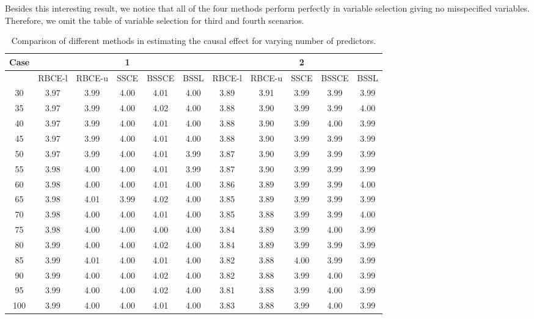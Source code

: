 \documentclass[preprint,12pt]{elsarticle}
\begin{document}
Besides this interesting result, we notice that all of the four methods perform
perfectly in variable selection giving no misspecified variables. Therefore,
we omit the table of variable selection for third and fourth scenarios.


\begin{table}[ht]
\centering
\tiny
\caption{Comparison of different methods in estimating the causal effect for varying number of predictors.}
\begin{tabular}{c|ccccc|ccccc}
  \hline
 Case&  &  & 1 &  &  &  &  & 2 &  &  \\ 
  \hline
 & RBCE-l & RBCE-u & SSCE & BSSCE & BSSL & RBCE-l & RBCE-u & SSCE & BSSCE & BSSL \\ 
  \hline
\hline
30 & 3.97 & 3.99 & 4.00 & 4.01 & 4.00 & 3.89 & 3.91 & 3.99 & 3.99 & 3.99 \\ 
  35 & 3.97 & 3.99 & 4.00 & 4.02 & 4.00 & 3.88 & 3.90 & 3.99 & 3.99 & 4.00 \\ 
  40 & 3.97 & 3.99 & 4.00 & 4.01 & 4.00 & 3.88 & 3.90 & 3.99 & 4.00 & 3.99 \\ 
  45 & 3.97 & 3.99 & 4.00 & 4.01 & 4.00 & 3.88 & 3.90 & 3.99 & 3.99 & 3.99 \\ 
  50 & 3.97 & 3.99 & 4.00 & 4.01 & 3.99 & 3.87 & 3.90 & 3.99 & 3.99 & 3.99 \\ 
  55 & 3.98 & 4.00 & 4.00 & 4.01 & 3.99 & 3.87 & 3.90 & 3.99 & 3.99 & 3.99 \\ 
  60 & 3.98 & 4.00 & 4.00 & 4.01 & 4.00 & 3.86 & 3.89 & 3.99 & 3.99 & 4.00 \\ 
  65 & 3.98 & 4.01 & 3.99 & 4.02 & 4.00 & 3.85 & 3.89 & 3.99 & 3.99 & 3.99 \\ 
  70 & 3.98 & 4.00 & 4.00 & 4.01 & 4.00 & 3.85 & 3.88 & 3.99 & 3.99 & 4.00 \\ 
  75 & 3.98 & 4.00 & 4.00 & 4.00 & 4.00 & 3.84 & 3.89 & 3.99 & 4.00 & 3.99 \\ 
  80 & 3.99 & 4.00 & 4.00 & 4.02 & 4.00 & 3.84 & 3.89 & 3.99 & 3.99 & 3.99 \\ 
  85 & 3.99 & 4.01 & 4.00 & 4.01 & 4.00 & 3.82 & 3.88 & 4.00 & 3.99 & 3.99 \\ 
  90 & 3.99 & 4.00 & 4.00 & 4.02 & 4.00 & 3.82 & 3.88 & 3.99 & 4.00 & 3.99 \\ 
  95 & 3.99 & 4.00 & 4.00 & 4.02 & 4.00 & 3.81 & 3.88 & 3.99 & 4.00 & 3.99 \\ 
  100 & 3.99 & 4.00 & 4.00 & 4.01 & 4.00 & 3.83 & 3.88 & 3.99 & 4.00 & 3.99 \\ 

\end{tabular}
\end{table}
\end{document}
